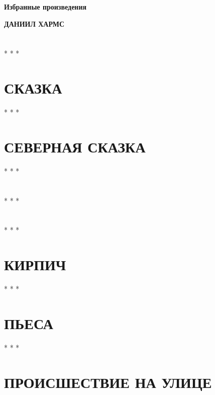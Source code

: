 \documentclass[a4paper,12pt,openany]{book}
\begin{document}
\begin{center}
{\Large\bfseries Избранные произведения}
\end{center}
\vspace{0.5cm}
\begin{center}
{\large\bfseries ДАНИИЛ ХАРМС}
\end{center}
\vspace{1cm}

\chapter{}

\vspace{0.5cm}
\begin{center} * * * \end{center}

\chapter{СКАЗКА}

\vspace{0.5cm}
\begin{center} * * * \end{center}

\chapter{СЕВЕРНАЯ СКАЗКА}

\vspace{0.5cm}
\begin{center} * * * \end{center}

\chapter{}

\vspace{0.5cm}
\begin{center} * * * \end{center}

\chapter{}

\vspace{0.5cm}
\begin{center} * * * \end{center}

\chapter{КИРПИЧ}

\vspace{0.5cm}
\begin{center} * * * \end{center}

\chapter{ПЬЕСА}

\vspace{0.5cm}
\begin{center} * * * \end{center}

\chapter{ПРОИСШЕСТВИЕ НА УЛИЦЕ}

\end{document}
